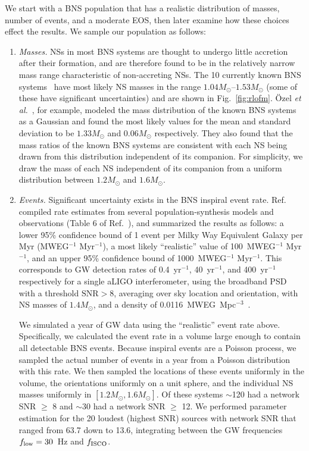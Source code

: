 \documentclass[twocolumn,prd,amssymb,aps,nofootinbib,showpacs,epsf]{revtex4}
\begin{document}
We start with a BNS population that has a realistic distribution of masses, number of events, and a moderate EOS, then later examine how these choices effect the results. We sample our population as follows:
\begin{enumerate}
\item \textit{Masses.} NSs in most BNS systems are thought to undergo little accretion after their formation, and are therefore found to be in the relatively narrow mass range characteristic of non-accreting NSs. The 10 currently known BNS systems~\cite{Lattimer2012} have most likely NS masses in the range $1.04M_\odot$--$1.53M_\odot$ (some of these have significant uncertainties) and are shown in Fig.~\ref{fig:rlofm}. \"Ozel {\it et al.}~\cite{OzelPsaltisNarayan2012}, for example, modeled the mass distribution of the known BNS systems as a Gaussian and found the most likely values for the mean and standard deviation to be $1.33M_\odot$ and $0.06M_\odot$ respectively. They also found that the mass ratios of the known BNS systems are consistent with each NS being drawn from this distribution independent of its companion. For simplicity, we draw the mass of each NS independent of its companion from a uniform distribution between $1.2M_\odot$ and $1.6M_\odot$. 

\item \textit{Events.} Significant uncertainty exists in the BNS inspiral event rate. Ref.~\cite{LIGORate2010} compiled rate estimates from several population-synthesis models and observations (Table 6 of Ref.~\cite{LIGORate2010}), and summarized the results as follows: a lower 95\% confidence bound of 1 event per Milky Way Equivalent Galaxy per Myr (MWEG$^{-1}$ Myr$^{-1}$), a most likely ``realistic'' value of 100~MWEG$^{-1}$ Myr$^{-1}$, and an upper 95\% confidence bound of 1000~MWEG$^{-1}$ Myr$^{-1}$. This corresponds to GW detection rates of 0.4~yr$^{-1}$, 40~yr$^{-1}$, and 400~yr$^{-1}$ respectively for a single aLIGO interferometer, using the broadband PSD with a threshold $\text{SNR} > 8$, averaging over sky location and orientation, with NS masses of $1.4M_\odot$, and a density of 0.0116~MWEG~Mpc$^{-3}$~\cite{LIGORate2010}. 

We simulated a year of GW data using the ``realistic'' event rate above. Specifically, we calculated the event rate in a volume large enough to contain all detectable BNS events. Because inspiral events are a Poisson process, we sampled the actual number of events in a year from a Poisson distribution with this rate. We then sampled the locations of these events uniformly in the volume, the orientations uniformly on a unit sphere, and the individual NS masses uniformly in $[1.2M_\odot, 1.6M_\odot]$. Of these systems $\sim$120 had a network SNR $\ge$ 8 and $\sim$30 had a network SNR $\ge$ 12. We performed parameter estimation for the 20 loudest (highest SNR) sources with network SNR that ranged from 63.7 down to 13.6, integrating between the GW frequencies $f_{\rm low} = 30$~Hz and $f_{\rm ISCO}$.


\end{enumerate}
\end{document}
